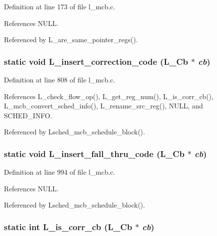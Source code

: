 Definition at line 173 of file l\_\-mcb.c.

References NULL.

Referenced by L\_\-are\_\-same\_\-pointer\_\-regs().
\subsubsection{\setlength{\rightskip}{0pt plus 5cm}static void L\_\-insert\_\-correction\_\-code (L\_\-Cb $\ast$ {\em cb})\hspace{0.3cm}{\tt  [static]}}\label{l__mcb_8c_9f582a6c0544dd2f38ec762ac7130a99}




Definition at line 808 of file l\_\-mcb.c.

References L\_\-check\_\-flow\_\-op(), L\_\-get\_\-reg\_\-num(), L\_\-is\_\-corr\_\-cb(), L\_\-mcb\_\-convert\_\-sched\_\-info(), L\_\-rename\_\-src\_\-reg(), NULL, and SCHED\_\-INFO.

Referenced by Lsched\_\-mcb\_\-schedule\_\-block().
\subsubsection{\setlength{\rightskip}{0pt plus 5cm}static void L\_\-insert\_\-fall\_\-thru\_\-code (L\_\-Cb $\ast$ {\em cb})\hspace{0.3cm}{\tt  [static]}}\label{l__mcb_8c_9343a80881ff36a7d4172fc3781befb3}




Definition at line 994 of file l\_\-mcb.c.

References NULL.

Referenced by Lsched\_\-mcb\_\-schedule\_\-block().
\subsubsection{\setlength{\rightskip}{0pt plus 5cm}static int L\_\-is\_\-corr\_\-cb (L\_\-Cb $\ast$ {\em cb})\hspace{0.3cm}{\tt  [static]}}\label{l__mcb_8c_f0220a0f5980572aa3150ec3bb07617d}




